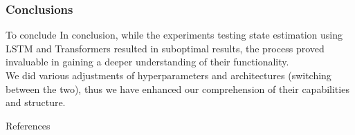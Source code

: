 \documentclass[aspectratio=169,t,xcolor=table]{beamer}
\begin{document}
\begin{frame}{}
    \frametitle{Conclusions}
\end{frame}

\begin{frame}{To conclude}
    In conclusion, while the experiments testing state estimation using LSTM and Transformers resulted in suboptimal results, the process proved invaluable in gaining a deeper understanding of their functionality.\\ \vspace{5mm} We did various adjustments of hyperparameters and architectures (switching between the two), thus we have enhanced our comprehension of their capabilities and structure.
\end{frame}

\begin{frame}[allowframebreaks]{References}
    \nocite{*} 
    \printbibliography
\end{frame}
\end{document}
